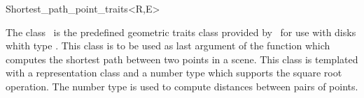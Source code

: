 
\begin{ccRefClass}{Shortest_path_point_traits<R,E>}
\label{pageShortest_path_point_traitsRef}

\ccDefinition

The class \ccRefName\ is the predefined geometric traits class provided by
\cgal\ for use with disks whith type .
This class is to be used as last argument of the  function
which computes the shortest path between two points in a scene.
This class is templated with a representation class  and a number type
 which supports the square root operation. The number type  is
used to compute distances between pairs of points.


\ccInheritsFrom
{}

\ccIsModel
{}

\ccSeeAlso

 \\

\ccTagDefaults
\end{ccRefClass}
\ccRefPageEnd

